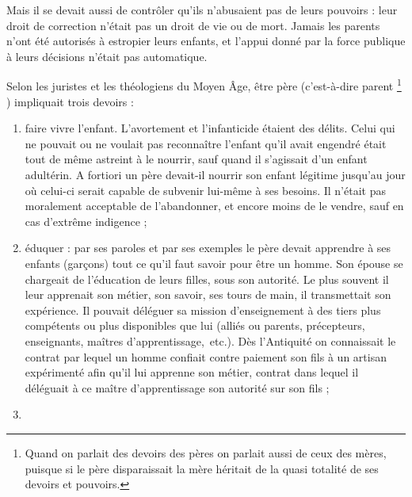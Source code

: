  Mais il se devait aussi de contrôler qu'ils n'abusaient pas de leurs pouvoirs : leur droit de correction n'était pas un droit de vie ou de mort. Jamais les parents n'ont été autorisés à estropier leurs enfants, et l'appui donné par la force publique à leurs décisions n'était pas automatique.

 Selon les juristes et les théologiens du Moyen Âge, être père (c'est-à-dire parent%
\footnote{Quand on parlait des devoirs des pères on parlait aussi de ceux des mères, puisque si le père disparaissait la mère héritait de la quasi totalité de ses devoirs et pouvoirs.}%
) impliquait trois devoirs : 
\begin{enumerate}
\item %
faire vivre l'enfant. L'avortement et l'infanticide étaient des délits. Celui qui ne pouvait ou ne voulait pas reconnaître l'enfant qu'il avait engendré était tout de même astreint à le nourrir, sauf quand il s'agissait d'un enfant adultérin. A fortiori un père devait-il nourrir son enfant légitime jusqu'au jour où celui-ci serait capable de subvenir lui-même à ses besoins. Il n'était pas moralement acceptable de l'abandonner, et encore moins de le vendre, sauf en cas d'extrême indigence ;
\item %
éduquer : par ses paroles et par ses exemples le père devait apprendre à ses enfants (garçons) tout ce qu'il faut savoir pour être un homme. Son épouse se chargeait de l'éducation de leurs filles, sous son autorité. Le plus souvent il leur apprenait son métier, son savoir, ses tours de main, il transmettait son expérience. Il pouvait déléguer sa mission d'enseignement à des tiers plus compétents ou plus disponibles que lui (alliés ou parents, précepteurs, enseignants, maîtres d'apprentissage,~etc.). Dès l'Antiquité on connaissait le contrat par lequel un homme confiait contre paiement son fils à un artisan expérimenté afin qu'il lui apprenne son métier, contrat dans lequel il déléguait à ce maître d'apprentissage son autorité sur son fils ;
\item %

\end{enumerate}
